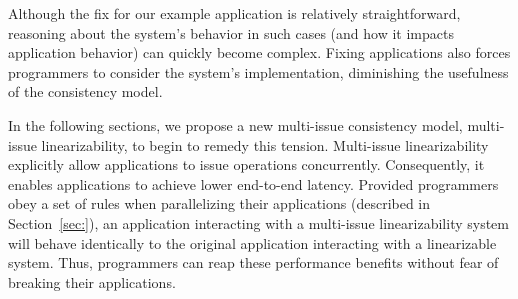 Although the fix for our example application is relatively straightforward,
reasoning about the system’s behavior in such cases (and how it impacts application behavior)
can quickly become complex.
Fixing applications also forces programmers to consider the system’s implementation,
diminishing the usefulness of the consistency model.

In the following sections, we propose a new multi-issue consistency model, multi-issue linearizability, to begin to remedy this tension. Multi-issue linearizability explicitly allow applications to issue operations concurrently. Consequently, it enables applications to achieve lower end-to-end latency. Provided programmers obey a set of rules when parallelizing their applications (described in Section~\ref{sec:}), an application interacting with a multi-issue linearizability system will behave identically to the original application interacting with a linearizable system. Thus, programmers can reap these performance benefits without fear of breaking their applications.
